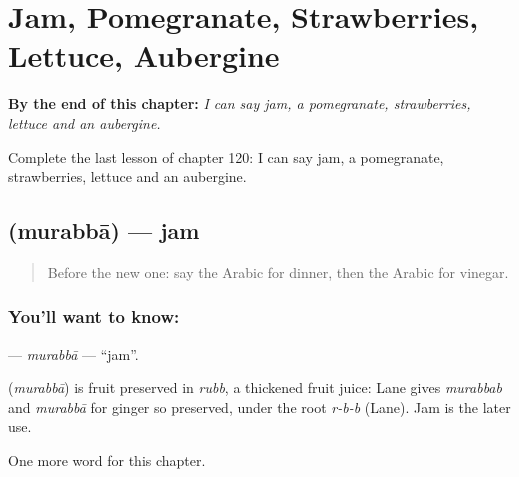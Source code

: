 
\chapter{Jam, Pomegranate, Strawberries, Lettuce, Aubergine}
\label{ch:ar-jam-pomegranate-strawberries-lettuce-aubergine}

\begin{chapteropening}
\textbf{By the end of this chapter:} \emph{I can say jam, a pomegranate, strawberries, lettuce and an aubergine.}

Complete the last lesson of chapter 120: I can say jam, a pomegranate, strawberries, lettuce and an aubergine.
\end{chapteropening}

\section[\texorpdfstring{\ar{مربى} (murabbā)}{مربى (murabbā)}]{ (murabbā) — jam}

\label{lesson:AR-C120-murabba}



\begin{quote}
Before the new one: say the Arabic for dinner, then the Arabic for vinegar.
\end{quote}

\subsection*{You'll want to know: }
\textbf{} — \emph{murabbā} — \textquotedblleft{}jam\textquotedblright{}.

\begin{cousinweb}
\textbf{} (\emph{murabbā}) is fruit preserved in \emph{rubb}, a thickened fruit juice: Lane gives \emph{murabbab} and \emph{murabbā} for ginger so preserved, under the root \emph{r-b-b} (Lane). Jam is the later use.
\end{cousinweb}

\begin{grammarlens}[title={What you've built}]
One more word for this chapter.
\end{grammarlens}

